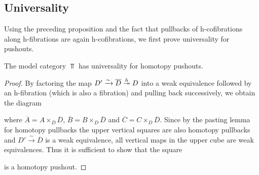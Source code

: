 \subsection*{Universality}
Using the preceding proposition and the fact that pullbacks of h-cofibrations along h-fibrations are again h-cofibrations, we first prove universality for pushouts.
\begin{prop}\label{lem:topUniversalPo}
    The model category $\Top$ has universality for homotopy pushouts.
    \begin{proof}
        By factoring the map $D'\xrightarrow{\sim}\overline{D}\xtwoheadrightarrow{h} D$ into a weak equivalence followed by an h-fibration (which is also a fibration) and pulling back successively, we obtain the diagram
        \begin{center}
        \end{center}
        where $\overline{A}=A\times_{D}\overline{D}$, $\overline{B}=B\times_{D}\overline{D}$ and $\overline{C}=C\times_{D}\overline{D}$.
        Since by the pasting lemma for homotopy pullbacks the upper vertical squares are also homotopy pullbacks and $D'\xrightarrow{\sim}\overline{D}$ is a weak equivalence, all vertical maps in the upper cube are weak equivalences.
        Thus it is sufficient to show that the square
        \begin{center}
        \end{center}
        is a homotopy pushout.


\end{proof}
\end{prop}
